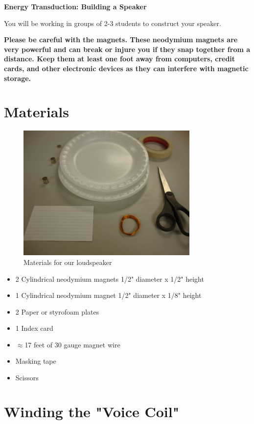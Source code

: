 \documentclass[11pt]{article}
\begin{document}
{\bf \LARGE Energy Transduction: Building a Speaker}

You will be working in groups of 2-3 students to construct your speaker. 

{\bf Please be careful with the magnets. These neodymium magnets are very powerful and can break or injure you if they snap together from a distance. Keep them at least one foot away from computers, credit cards, and other electronic devices as they can interfere with magnetic storage.}

\section*{Materials}		

\begin{figure}[htb]\center
\includegraphics[width=0.8\textwidth]{images/DSC00407.pdf}
\caption{Materials for our loudspeaker}
\label{fig:materials}
\end{figure}

\begin{itemize}
	\item 2 Cylindrical neodymium magnets 1/2" diameter x 1/2" height
	\item 1 Cylindrical neodymium magnet 1/2" diameter x 1/8" height
	\item 2 Paper or styrofoam plates
	\item 1 Index card
	\item $\approx$17 feet of 30 gauge magnet wire
	\item Masking tape
	\item Scissors
\end{itemize}

\newpage

\section*{Winding the "Voice Coil"}			%
\end{document}
